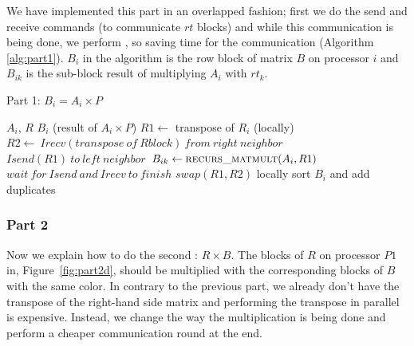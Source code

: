 We have implemented this part in an overlapped fashion; first we do the send and receive commands (to communicate $rt$ blocks) and while this communication is being done, we perform \mm, so saving time for the communication (Algorithm \ref{alg:part1}). $B_{i}$ in the algorithm is the row block of matrix $B$ on processor $i$ and $B_{ik}$ is the sub-block result of multiplying $A_i$ with $rt_k$.

\begin{algorithm}[H] 
  \caption{Part 1: $B_i = A_i \times P$} \label{alg:part1} 
  \begin{algorithmic}[1]
    \Require $A_i$, $R$
    \Ensure  $B_i$ (result of $A_i \times P$)
    \State $R1 \leftarrow$ transpose of $R_i$ (locally)
      \State $R2 \leftarrow\ Irecv(transpose\ of\ R block)\ from\ right\ neighbor$
      \State $Isend(R1)\ to\ left\ neighbor$
      \State $B_{ik} \leftarrow \textsc{recurs\_matmult}(A_i, R1)$ 
      \State $wait\ for\ Isend\ and\ Irecv\ to\ finish$
      \State $swap(R1,R2)$
    \EndFor
    \State locally sort $B_i$ and add duplicates
  \end{algorithmic}
\end{algorithm}


\subsubsection{Part 2}

Now we explain how to do the second \mm: $R \times B$. The blocks of $R$ on processor $P1$ in, Figure~\ref{fig:part2d}, should be multiplied with the corresponding blocks of $B$ with the same color. In contrary to the previous part, we already don't have the transpose of the right-hand side matrix and performing the transpose in parallel is expensive. Instead, we change the way the multiplication is being done and perform a cheaper communication round at the end.


